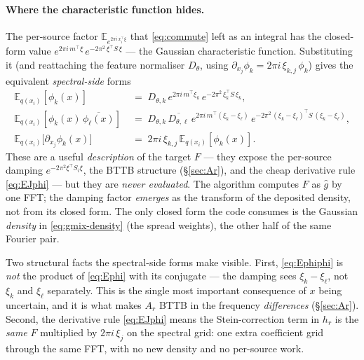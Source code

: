 \documentclass[11pt]{article}
\newcommand{\Eq}[1][q]{\mathbb{E}_{#1}}
\newcommand{\Eqx}{\mathbb{E}_{q(x_i)}}
\begin{document}
\paragraph{Where the characteristic function hides.}
The per-source factor $\Eq[e^{2\pi i\,x_i^\top\xi}]$ that
\eqref{eq:commute} left as an integral has the closed-form value
$e^{2\pi i\,m^\top\xi}\,e^{-2\pi^2\,\xi^\top S\,\xi}$ --- the Gaussian
characteristic function.  Substituting it (and reattaching the feature
normaliser $D_\theta$, using $\partial_{x_j}\phi_k = 2\pi
i\,\xi_{k,j}\,\phi_k$) gives the equivalent \emph{spectral-side} forms
\begin{align}
\Eqx[\phi_k(x)]
&\;=\; D_{\theta,k}\,e^{2\pi i\,m^\top \xi_k}\,e^{-2\pi^2\,\xi_k^\top S\,\xi_k},
\label{eq:Ephi}
\\[2pt]
\Eqx[\phi_k(x)\,\overline{\phi_\ell(x)}]
&\;=\; D_{\theta,k}\,\overline{D_{\theta,\ell}}\,
e^{2\pi i\, m^\top(\xi_k-\xi_\ell)}\,
e^{-2\pi^2\,(\xi_k-\xi_\ell)^\top S\,(\xi_k-\xi_\ell)},
\label{eq:Ephiphi}
\\[2pt]
\Eqx\!\bigl[\partial_{x_j}\phi_k(x)\bigr]
&\;=\; 2\pi i\,\xi_{k,j}\,\Eqx[\phi_k(x)].
\label{eq:EJphi}
\end{align}
These are a useful \emph{description} of the target $F$ --- they expose
the per-source damping $e^{-2\pi^2\xi^\top S_i\xi}$, the BTTB structure
(\S\ref{sec:Ar}), and the cheap derivative rule \eqref{eq:EJphi} ---
but they are \emph{never evaluated}.  The algorithm computes $F$ as
$\widehat g$ by one FFT; the damping factor \emph{emerges} as the
transform of the deposited density, not from its closed form.  The only
closed form the code consumes is the Gaussian \emph{density} in
\eqref{eq:gmix-density} (the spread weights), the other half of the
same Fourier pair.

Two structural facts the spectral-side forms make visible.  First,
\eqref{eq:Ephiphi} is \emph{not} the product of \eqref{eq:Ephi} with
its conjugate --- the damping sees $\xi_k - \xi_\ell$, not $\xi_k$ and
$\xi_\ell$ separately.  This is the single most important consequence
of $x$ being uncertain, and it is what makes $A_r$ BTTB in the
frequency \emph{differences} (\S\ref{sec:Ar}).  Second, the derivative
rule \eqref{eq:EJphi} means the Stein-correction term in $h_r$ is the
\emph{same} $F$ multiplied by $2\pi i\,\xi_j$ on the spectral grid: one
extra coefficient grid through the same FFT, with no new density and no
per-source work.

\end{document}
